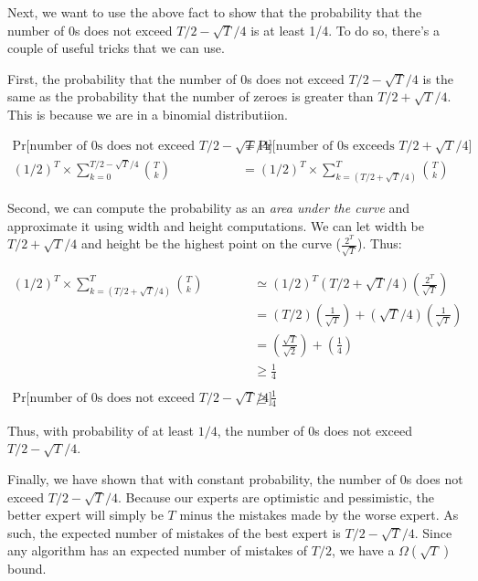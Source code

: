 \documentclass[11pt]{article}
\theoremstyle{definition}
\theoremstyle{case}
\theoremstyle{theorem}
\begin{document}
\begin{enumerate}[label=(\alph*)]
Next, we want to use the above fact to show that the probability that the number of 0s does not exceed $T/2 - \sqrt T / 4$ is
at least 1/4. To do so, there's a couple of useful tricks that we can use. 

First, the probability that the number of 0s does not exceed $T/2 - \sqrt T / 4$ is the same as the probability
that the number of zeroes is greater than $T/2 + \sqrt T / 4$. This is because we are in a binomial distributiion.

\begin{align*}
  \text{Pr[number of 0s does not exceed $T/2 - \sqrt T /4$]} &= \text{Pr[number of 0s exceeds $T/2 + \sqrt T /4$]} \\
  (1/2)^{T} \times \sum_{k=0}^{T/2 - \sqrt T /4} {T \choose k} &= (1/2)^{T} \times \sum_{k=(T/2 + \sqrt T / 4)}^{T} {T \choose k}
\end{align*}

Second, we can compute the probability as an \textit{area under the curve} and approximate it using width and height computations.
We can let width be $T/2 + \sqrt T / 4$ and height be the highest point on the curve ($\frac{2^T}{\sqrt T}$). Thus:

\begin{align*}
  (1/2)^{T} \times \sum_{k=(T/2 + \sqrt T / 4)}^{T} {T \choose k} &\simeq (1/2)^{T} (T/2 + \sqrt T / 4) (\frac{2^T}{\sqrt T}) \\
                                                                  &= (T/2)(\frac{1}{\sqrt T}) + (\sqrt T / 4)(\frac{1}{\sqrt T}) \\
                                                                  &= (\frac{\sqrt T}{\sqrt 2}) + (\frac{1}{4}) \\
                                                                  &\geq \frac{1}{4} \\
  \\
  \text{Pr[number of 0s does not exceed $T/2 - \sqrt T /4$]} &\geq \frac{1}{4}                                                                  
\end{align*}

Thus, with probability of at least $1/4$, the number of 0s does not exceed $T/2 - \sqrt T / 4$.

Finally, we have shown that with constant probability, the number of 0s does not exceed $T/2 - \sqrt T / 4$. Because our
experts are optimistic and pessimistic, the better expert will simply be $T$ minus the mistakes made by the worse expert.
As such, the expected number of mistakes of the best expert is $T/2 - \sqrt T / 4$. Since any algorithm has an expected number of
mistakes of $T/2$, we have a $\Omega(\sqrt T)$ bound.

\end{enumerate}
\end{document}
